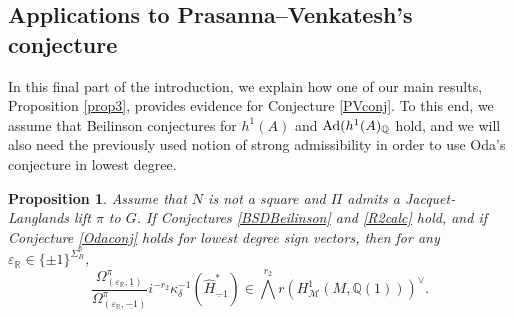 \documentclass{amsart}
\newtheorem{proposition}[theorem]{Proposition}
\theoremstyle{definition}
\theoremstyle{remark}
\numberwithin{equation}{section}
\newcommand{\Q}{{\mathbb Q}}
\newcommand{\R}{{\mathbb R}}
\newcommand{\cM}{{\mathcal M}}
\begin{document}
\subsection{Applications to Prasanna--Venkatesh's conjecture}
In this final part of the introduction, we explain how one of our main results, Proposition \ref{prop3}, provides evidence for Conjecture \ref{PVconj}. To this end, we assume that Beilinson conjectures for $h^1(A)$ and
${\rm Ad}(h^1(A)_\Q$ hold, and we will also need the previously used notion of strong admissibility in order to use Oda's conjecture in lowest degree.
\begin{proposition}
Assume that $N$ is not a square and $\Pi$ admits a Jacquet-Langlands lift $\pi$ to $G$. If Conjectures \ref{BSDBeilinson} and \ref{R2calc} hold, and if Conjecture \ref{Odaconj} holds for lowest degree sign vectors, then for any $\varepsilon_\R\in\{\pm 1\}^{\Sigma_B^\R}$,
\[
 \frac{\Omega_{(\varepsilon_\R,\underline 1)}^\pi}{\Omega_{(\varepsilon_\R,\underline{-1})}^\pi}i^{-r_2}\kappa_\delta^{-1}\left(\hat H_{{\underline -1}}^\ast\right)\in \bigwedge^{r_2}r\left(H^1_{\cM}(M,\Q(1))\right)^\vee.
\]
\end{proposition} 
\end{document}
